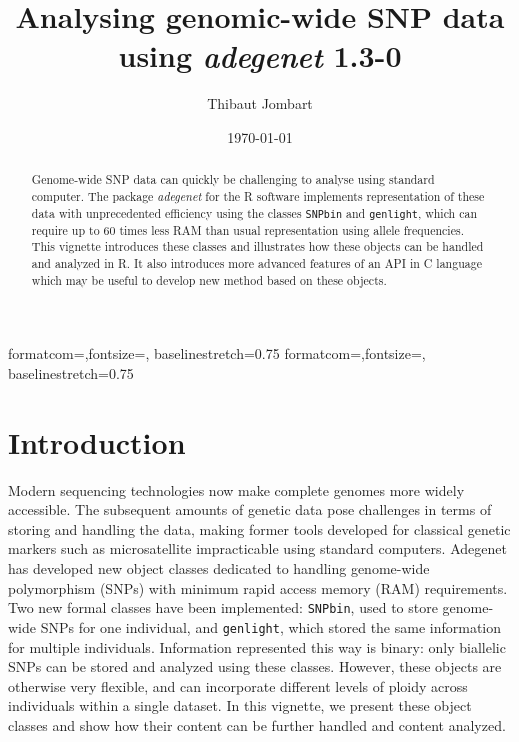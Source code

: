 \documentclass{article}
\title{Analysing genomic-wide SNP data using  \textit{adegenet} 1.3-0}
\author{Thibaut Jombart}
\date{\today}
\begin{document}
{formatcom={\color{Sinput}},fontsize=\footnotesize, baselinestretch=0.75}
{formatcom={\color{Soutput}},fontsize=\footnotesize, baselinestretch=0.75}

\color{black}

\maketitle

\begin{abstract}
  Genome-wide SNP data can quickly be challenging to analyse using standard
  computer. The package \textit{adegenet} \cite{tjart05} for the R software \cite{np145}
  implements representation of these data with unprecedented efficiency
  using the classes \texttt{SNPbin} and \texttt{genlight}, which can require up to 60 times less RAM than usual
  representation using allele frequencies.
  This vignette introduces these classes and illustrates how these objects can be handled and
  analyzed in R.
  It also introduces more advanced features of an API in C language which may be useful to develop
  new method based on these objects.
\end{abstract}

\newpage

\tableofcontents


\newpage
\section{Introduction}
Modern sequencing technologies now make complete genomes more widely accessible.
The subsequent amounts of genetic data pose challenges in terms of storing and handling the data,
making former tools developed for classical genetic markers such as microsatellite impracticable using
standard computers.
Adegenet has developed new object classes dedicated to handling genome-wide polymorphism (SNPs) with
minimum rapid access memory (RAM) requirements.
\\

Two new formal classes have been implemented: \texttt{SNPbin}, used to store genome-wide SNPs for
one individual, and \texttt{genlight}, which stored the same information for multiple individuals.
Information represented this way is binary: only biallelic SNPs can be stored and analyzed using these classes.
However, these objects are otherwise very flexible, and can incorporate different levels of ploidy
across individuals within a single dataset.
In this vignette, we present these object classes and show how their content can be further handled and
content analyzed.
\end{document}
